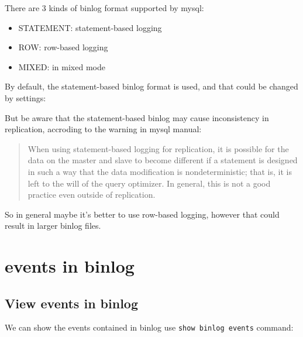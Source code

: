 \documentclass[12pt]{article}
\begin{document}
There are 3 kinds of binlog format supported by mysql:

\begin{itemize}
\tightlist
\item
  STATEMENT: statement-based logging
\item
  ROW: row-based logging
\item
  MIXED: in mixed mode
\end{itemize}

By default, the statement-based binlog format is used, and that could be changed by settings:

\begin{Shaded}
\begin{Highlighting}[]
\KeywordTok{[mysqld]}
\OtherTok{=}
\OtherTok{=}
\OtherTok{=}
\end{Highlighting}
\end{Shaded}

But be aware that the statement-based binlog may cause inconsistency in replication, accroding to the warning in mysql manual:

\begin{quote}
When using statement-based logging for replication, it is possible for the data on the master and slave to become different if a statement is designed in such a way that the data modification is nondeterministic; that is, it is left to the will of the query optimizer. In general, this is not a good practice even outside of replication.
\end{quote}

So in general maybe it's better to use row-based logging, however that could result in larger binlog files.

\section{events in binlog}\label{events-in-binlog}

\subsection{View events in binlog}\label{view-events-in-binlog}

We can show the events contained in binlog use \texttt{show\ binlog\ events} command:
\end{document}
